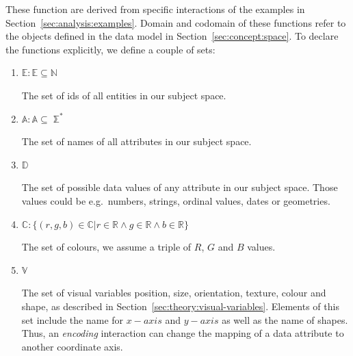 \documentclass{article}
\begin{document}
These function are derived from specific interactions of the examples in Section~\ref{sec:analysis:examples}.
Domain and codomain of these functions refer to the objects defined in the data model in Section~\ref{sec:concept:space}.
To declare the functions explicitly, we define a couple of sets:
\begin{enumerate}
    \item
        $ \mathbb{E} : \mathbb{E} \subseteq \mathbb{N} $

        The set of ids of all entities in our subject space.
    \item
        $ \mathbb{A} : \mathbb{A} \subseteq \mathbb{\sum^*} $

        The set of names of all attributes in our subject space.
    \item
        $ \mathbb{D} $

        The set of possible data values of any attribute in our subject space. Those values could be e.g.\ numbers, strings, ordinal values, dates or geometries.
    \item
        $ \mathbb{C}: \{ (r,g,b) \in \mathbb{C} | r \in \mathbb{R} \land g \in \mathbb{R} \land b \in \mathbb{R} \}$

        The set of colours, we assume a triple of $R$, $G$ and $B$ values.
    \item
        $ \mathbb{V} $

        The set of visual variables position, size, orientation, texture, colour and shape, as described in Section~\ref{sec:theory:visual-variables}.
        Elements of this set include the name for $x-axis$ and $y-axis$ as well as the name of shapes.
        Thus, an \emph{encoding} interaction can change the mapping of a data attribute to another coordinate axis.
\end{enumerate}
\end{document}
